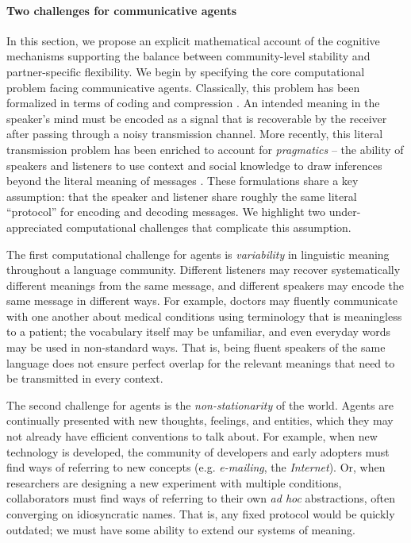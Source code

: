 

\paragraph{Two challenges for communicative agents}

In this section, we propose an explicit mathematical account of the cognitive mechanisms supporting the balance between community-level stability and partner-specific flexibility.
We begin by specifying the core computational problem facing communicative agents.
Classically, this problem has been formalized in terms of coding and compression \cite{Shannon48}. 
An intended meaning in the speaker's mind must be encoded as a signal that is recoverable by the receiver after passing through a noisy transmission channel.
More recently, this literal transmission problem has been enriched to account for \emph{pragmatics} -- the ability of speakers and listeners to use context and social knowledge to draw inferences beyond the literal meaning of messages \cite{FrankeJager16_ProbabilisticPragmatics,goodman_pragmatic_2016}.
These formulations share a key assumption: that the speaker and listener share roughly the same literal ``protocol'' for encoding and decoding messages.
We highlight two under-appreciated computational challenges that complicate this assumption. %

The first computational challenge for agents is \emph{variability} in linguistic meaning throughout a language community. 
Different listeners may recover systematically different meanings from the same message, and different speakers may encode the same message in different ways.
For example, doctors may fluently communicate with one another about medical conditions using terminology that is meaningless to a patient; the vocabulary itself may be unfamiliar, and even everyday words may be used in non-standard ways.
That is, being fluent speakers of the same language does not ensure perfect overlap for the relevant meanings that need to be transmitted in every context.

The second challenge for agents is the \emph{non-stationarity} of the world. 
Agents are continually presented with new thoughts, feelings, and entities, which they may not already have efficient conventions to talk about.
For example, when new technology is developed, the community of developers and early adopters must find ways of referring to new concepts (e.g. \emph{e-mailing}, the \emph{Internet}). 
Or, when researchers are designing a new experiment with multiple conditions, collaborators must find ways of referring to their own \emph{ad hoc} abstractions, often converging on idiosyncratic names.
That is, any fixed protocol would be quickly outdated; we must have some ability to extend our systems of meaning.

